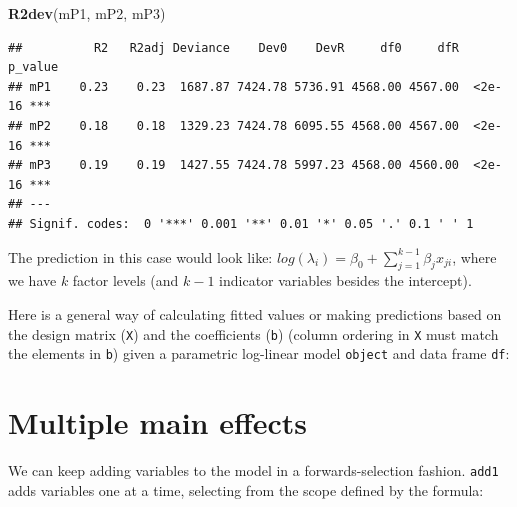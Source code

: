 \documentclass[12pt,]{book}
\newenvironment{Shaded}{\begin{snugshade}}{\end{snugshade}}
\newcommand{\CommentTok}[1]{\textcolor[rgb]{0.56,0.35,0.01}{\textit{#1}}}
\newcommand{\DataTypeTok}[1]{\textcolor[rgb]{0.13,0.29,0.53}{#1}}
\newcommand{\DecValTok}[1]{\textcolor[rgb]{0.00,0.00,0.81}{#1}}
\newcommand{\KeywordTok}[1]{\textcolor[rgb]{0.13,0.29,0.53}{\textbf{#1}}}
\newcommand{\NormalTok}[1]{#1}
\newcommand{\OperatorTok}[1]{\textcolor[rgb]{0.81,0.36,0.00}{\textbf{#1}}}
\newcommand{\StringTok}[1]{\textcolor[rgb]{0.31,0.60,0.02}{#1}}
\begin{document}
\begin{Shaded}
\begin{Highlighting}[]
\KeywordTok{R2dev}\NormalTok{(mP1, mP2, mP3)}
\end{Highlighting}
\end{Shaded}

\begin{verbatim}
##          R2   R2adj Deviance    Dev0    DevR     df0     dfR p_value    
## mP1    0.23    0.23  1687.87 7424.78 5736.91 4568.00 4567.00  <2e-16 ***
## mP2    0.18    0.18  1329.23 7424.78 6095.55 4568.00 4567.00  <2e-16 ***
## mP3    0.19    0.19  1427.55 7424.78 5997.23 4568.00 4560.00  <2e-16 ***
## ---
## Signif. codes:  0 '***' 0.001 '**' 0.01 '*' 0.05 '.' 0.1 ' ' 1
\end{verbatim}

The prediction in this case would look like:
\(log(\lambda_i)=\beta_0 + \sum_{j=1}^{k-1} \beta_j x_{ji}\), where we have \(k\) factor levels
(and \(k-1\) indicator variables besides the intercept).

Here is a general way of calculating fitted values or making
predictions based on the design matrix (\texttt{X}) and the coefficients (\texttt{b})
(column ordering in \texttt{X} must match the elements in \texttt{b})
given a parametric log-linear model \texttt{object} and data frame \texttt{df}:

\begin{Shaded}
\end{Shaded}

\hypertarget{multiple-main-effects}{%
\section{Multiple main effects}\label{multiple-main-effects}}

We can keep adding variables to the model in a forwards-selection fashion.
\texttt{add1} adds variables one at a time, selecting from the scope defined by the formula:

\begin{Shaded}
\end{Shaded}
\end{document}

